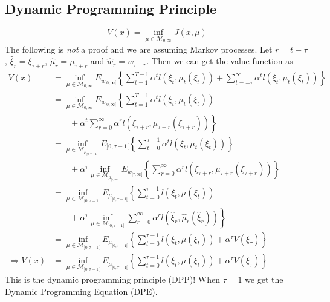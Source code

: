 \subsection{Dynamic Programming Principle}
$$V(x) = \inf_{\mu\in\mathcal{M}_{0,\infty}} J(x,\mu)$$
The following is \textit{not} a proof and we are assuming Markov processes.
Let $r=t-\tau$, $\hat{\xi}_r=\xi_{\tau+r}$, $\hat{\mu}_r=\mu_{\tau+r}$ and $\hat{w}_r=w_{\tau+r}$.
Then we can get the value function as
\begin{align}
V(x) &= \inf_{\mu\in\mathcal{M}_{0,\infty}} E_{w_{]0,\infty[}} \left\lbrace \sum_{t=1}^{T-1} \alpha^t l(\xi_t,\mu_t(\xi_t)) + \sum_{t=-\tau}^\infty \alpha^t l(\xi_t,\mu_t(\xi_t))\right\rbrace \nonumber \\%
&= \inf_{\mu\in\mathcal{M}_{0,\infty}} E_{w_{]0,\infty[}} \left\lbrace \sum_{t=1}^{T-1} \alpha^t l(\xi_t,\mu_t(\xi_t)) \right. \nonumber \\%
&\left. \qquad +  \alpha^t \sum_{r=0}^\infty \alpha^r l(\xi_{\tau+r},\mu_{\tau+r}(\xi_{\tau+r})) \right\rbrace \nonumber \\
&= \inf_{\mu\in\mathcal{M}_{\mu_{]0,\tau-1[}}} E_{]0,\tau-1[} \left\lbrace \sum_{t=0}^{\tau-1} \alpha^t l(\xi_t,\mu_t(\xi_t))\right\rbrace \nonumber \\%
&\qquad + \alpha^\tau\inf_{\mu\in\mathcal{M}_{\mu_{]\tau,\infty[}}} E_{w_{]\tau,\infty[}} \left\lbrace \sum_{r=0}^\infty\alpha^r l(\xi_{\tau+r},\mu_{\tau+r}(\xi_{\tau+r}))\right\rbrace \nonumber \\%
&= \inf_{\mu\in\mathcal{M}_{]0,\tau-1[}} E_{\mu_{]0,\tau-1[}} \left\lbrace \sum_{t=0}^{\tau-1} l(\xi_t,\mu(\xi_t)) \right. \nonumber \\%
&\left. \qquad + \alpha^\tau \inf_{\mu\in\mathcal{M}_{]0,\tau-1[}} \sum_{r=0}^\infty \alpha^r l(\hat{\xi}_r,\hat{\mu}_r(\hat{\xi}_r)) \right\rbrace \nonumber \\%
&= \inf_{\mu\in\mathcal{M}_{]0,\tau-1[}} E_{\mu_{]0,\tau-1[}} \left\lbrace \sum_{t=0}^{\tau-1} l(\xi_t,\mu(\xi_t)) + \alpha^\tau V(\xi_\tau) \right\rbrace \nonumber \nonumber \\%
\Rightarrow V(x) &= \inf_{\mu\in\mathcal{M}_{]0,\tau-1[}} E_{\mu_{]0,\tau-1[}} \left\lbrace \sum_{t=0}^{\tau-1} l(\xi_t,\mu(\xi_t)) + \alpha^\tau V(\xi_\tau) \right\rbrace%
\end{align}
This is the dynamic programming principle (DPP)! When $\tau=1$ we get the Dynamic Programming Equation (DPE).

